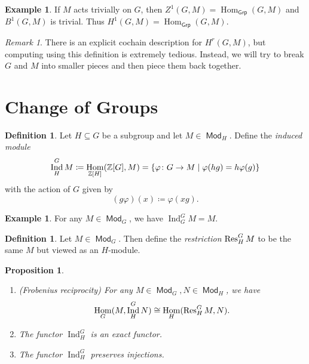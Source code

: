 \documentclass[leqno, openany]{memoir}
\newtheorem{prop}[thm]{Proposition}
\theoremstyle{definition}
\newtheorem{defn}[thm]{Definition}
\newtheorem{exm}[thm]{Example}
\theoremstyle{remark}
\newtheorem{rmk}[thm]{Remark}
\theoremstyle{plain}
\theoremstyle{definition}
\theoremstyle{remark}
\newcommand{\Z}{\mathbb{Z}}
\newcommand{\ms}[1]{\mathsf{#1}}
\DeclareMathOperator{\Hom}{Hom}
\DeclareMathOperator{\Mod}{\mathsf{Mod}}
\DeclareMathOperator{\Ind}{Ind}
\begin{document}
\begin{exm}
    If $M$ acts trivially on $G$, then $Z^1(G, M) = \Hom_{\ms{Grp}}(G, M)$ and $B^1(G, M)$ is trivial. Thus $H^1(G, M) = \Hom_{\ms{Grp}}(G, M)$.
\end{exm}

\begin{rmk}
    There is an explicit cochain description for $H^r(G, M)$, but computing using this definition is extremely tedious. Instead, we will try to break $G$ and $M$ into smaller pieces and then piece them back together.
\end{rmk}

\section{Change of Groups}%
\label{sec:change_of_groups}

\begin{defn}
    Let $H \subseteq G$ be a subgroup and let $M \in \Mod_H$. Define the \textit{induced module}
    \[ \Ind_H^G M \coloneqq \Hom_{\Z[H]} (\Z[G], M) = \qty{\varphi \colon G \to M \mid \varphi(hg) = h \varphi(g)} \]
    with the action of $G$ given by
    \[ (g \varphi)(x) \coloneqq \varphi(xg). \]
\end{defn}

\begin{exm}
    For any $M \in \Mod_G$, we have $\Ind_G^G M = M$.
\end{exm}

\begin{defn}
    Let $M \in \Mod_G$. Then define the \textit{restriction} $\Res_H^G M$ to be the same $M$ but viewed as an $H$-module. 
\end{defn}

\begin{prop}\leavevmode
    \begin{enumerate}
        \item (Frobenius reciprocity) For any $M \in \Mod_G, N \in \Mod_H$, we have
            \[ \Hom_G(M, \Ind_H^G N) \cong \Hom_H(\Res_H^G M, N). \]
        \item The functor $\Ind_H^G$ is an exact functor.
        \item The functor $\Ind_H^G$ preserves injections.
    \end{enumerate}
\end{prop}
\end{document}
